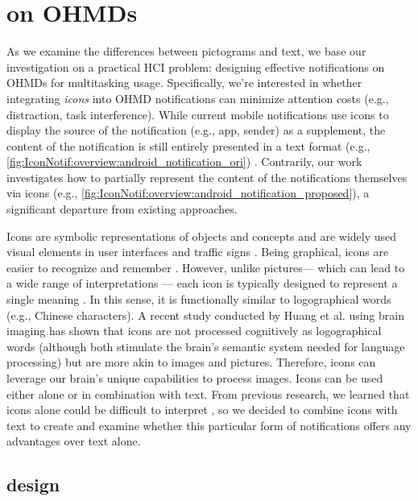 \section{ on OHMDs}
\label{sec:Iconnotif:icon_augmentation}

As we examine the differences between pictograms and text, we base our investigation on a practical HCI problem: designing effective notifications on OHMDs for multitasking usage. Specifically, we're interested in whether integrating \textit{icons} into OHMD notifications can minimize attention costs (e.g., distraction, task interference). While current mobile notifications use icons to display the source of the notification (e.g., app, sender) as a supplement, the content of the notification is still entirely presented in a text format (e.g., \autoref{fig:IconNotif:overview:android_notification_ori}) \cite{apple_notifications_2022, android_android_2021}. Contrarily, our work investigates how to partially represent the content of the notifications themselves via icons (e.g., \autoref{fig:IconNotif:overview:android_notification_proposed}), a significant departure from existing approaches.

Icons are symbolic representations of objects and concepts and are widely used visual elements in user interfaces and traffic signs \cite{tijus_design_2007, caplin_2001_icon}. Being graphical, icons are easier to recognize and remember \cite[Ch~6]{tijus_design_2007, wickens_engineering_2015}. However, unlike pictures--- which can lead to a wide range of interpretations \cite{theios_theoretical_1989}--- each icon is typically designed to represent a single meaning \cite{caplin_2001_icon}. In this sense, it is functionally similar to logographical words (e.g., Chinese characters). A recent study conducted by Huang et al. \cite{huang_how_2015} using brain imaging has shown that icons are not processed cognitively as logographical words (although both stimulate the brain's semantic system needed for language processing) but are more akin to images and pictures. Therefore, icons can leverage our brain's unique capabilities to process images. Icons can be used either alone or in combination with text. From previous research, we learned that icons alone could be difficult to interpret \cite{wiedenbeck_use_1999}, so we decided to combine icons with text to create  and examine whether this particular form of notifications offers any advantages over text alone.




\subsection{\Iconnotif{} design}

